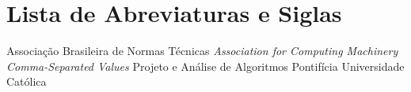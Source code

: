 \chapter*{Lista de Abreviaturas e Siglas}


\begin{acronym}
 {Associação Brasileira de Normas Técnicas}
 {\textit{Association for Computing Machinery}}
 {\textit{Comma-Separated Values}}
 {Projeto e Análise de Algoritmos}
 {Pontifícia Universidade Católica}
\end{acronym}
